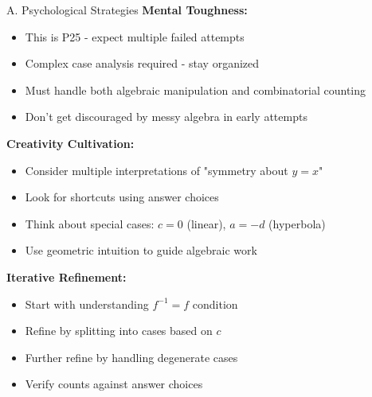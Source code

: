 \documentclass[12pt]{article}
\begin{document}
\begin{strategybox}{A. Psychological Strategies}
\textbf{Mental Toughness:}
\begin{itemize}
    \item This is P25 - expect multiple failed attempts
    \item Complex case analysis required - stay organized
    \item Must handle both algebraic manipulation and combinatorial counting
    \item Don't get discouraged by messy algebra in early attempts
\end{itemize}

\textbf{Creativity Cultivation:}
\begin{itemize}
    \item Consider multiple interpretations of "symmetry about $y=x$"
    \item Look for shortcuts using answer choices
    \item Think about special cases: $c=0$ (linear), $a=-d$ (hyperbola)
    \item Use geometric intuition to guide algebraic work
\end{itemize}

\textbf{Iterative Refinement:}
\begin{itemize}
    \item Start with understanding $f^{-1} = f$ condition
    \item Refine by splitting into cases based on $c$
    \item Further refine by handling degenerate cases
    \item Verify counts against answer choices
\end{itemize}
\end{strategybox}
\end{document}
